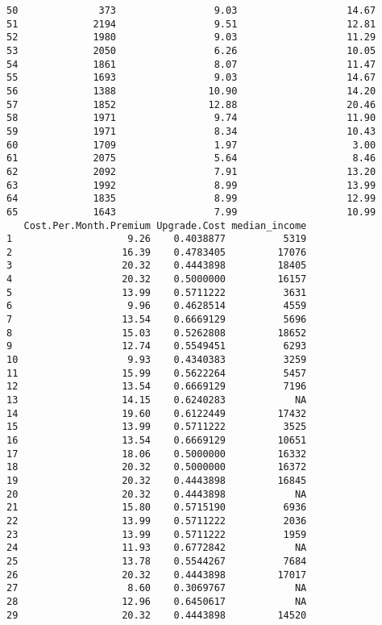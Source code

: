 \documentclass[
]{article}
\begin{document}
\begin{verbatim}
50              373                 9.03                   14.67
51             2194                 9.51                   12.81
52             1980                 9.03                   11.29
53             2050                 6.26                   10.05
54             1861                 8.07                   11.47
55             1693                 9.03                   14.67
56             1388                10.90                   14.20
57             1852                12.88                   20.46
58             1971                 9.74                   11.90
59             1971                 8.34                   10.43
60             1709                 1.97                    3.00
61             2075                 5.64                    8.46
62             2092                 7.91                   13.20
63             1992                 8.99                   13.99
64             1835                 8.99                   12.99
65             1643                 7.99                   10.99
   Cost.Per.Month.Premium Upgrade.Cost median_income
1                    9.26    0.4038877          5319
2                   16.39    0.4783405         17076
3                   20.32    0.4443898         18405
4                   20.32    0.5000000         16157
5                   13.99    0.5711222          3631
6                    9.96    0.4628514          4559
7                   13.54    0.6669129          5696
8                   15.03    0.5262808         18652
9                   12.74    0.5549451          6293
10                   9.93    0.4340383          3259
11                  15.99    0.5622264          5457
12                  13.54    0.6669129          7196
13                  14.15    0.6240283            NA
14                  19.60    0.6122449         17432
15                  13.99    0.5711222          3525
16                  13.54    0.6669129         10651
17                  18.06    0.5000000         16332
18                  20.32    0.5000000         16372
19                  20.32    0.4443898         16845
20                  20.32    0.4443898            NA
21                  15.80    0.5715190          6936
22                  13.99    0.5711222          2036
23                  13.99    0.5711222          1959
24                  11.93    0.6772842            NA
25                  13.78    0.5544267          7684
26                  20.32    0.4443898         17017
27                   8.60    0.3069767            NA
28                  12.96    0.6450617            NA
29                  20.32    0.4443898         14520

\end{verbatim}
\end{document}
